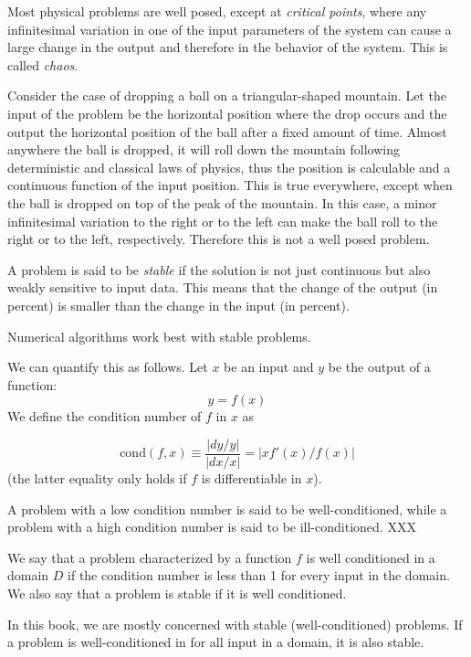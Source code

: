 \documentclass[justified, sixbynine]{tufte-book}
\def\func{\textrm}
\theoremstyle{plain}%
\newtheorem * {corollary}{Corollary}
\theoremstyle{definition}
\theoremstyle{remark}
\newtheorem * {remark}{Remark}
\newtheorem * {note}{Note}
\begin{document}
\begin{fullwidth}

Most physical problems are well posed, except at {\it critical points}, where any infinitesimal variation in one of the input parameters of the system can cause a large change in the output and therefore in the behavior of the system. This is called {\it chaos}.

Consider the case of dropping a ball on a triangular-shaped mountain. Let the input of the problem be the horizontal position where the drop occurs and the output the horizontal position of the ball after a fixed amount of time. Almost anywhere the ball is dropped, it will roll down the mountain following deterministic and classical laws of physics, thus the position is calculable and a continuous function of the input position. This is true everywhere, except when the ball is dropped on top of the peak of the mountain. In this case, a minor infinitesimal variation to the right or to the left can make the ball roll to the right or to the left, respectively.  Therefore this is not a well posed problem.

A problem is said to be {\it stable} if the solution is not just continuous but also weakly sensitive to input data. This means that the change of the output (in percent) is smaller than the change in the input (in percent).

Numerical algorithms work best with stable problems.

We can quantify this as follows. Let $x$ be an input and $y$ be the output of a function:
\begin{equation}
y = f(x)
\end{equation}
We define the condition number of $f$ in $x$ as


\begin{equation}
\func{cond}(f, x) \equiv \frac{|dy/y|}{|dx/x|} = |x f'(x)/f(x)|
\end{equation}
(the latter equality only holds if $f$ is differentiable in $x$).

A problem with a low condition number is said to be well-conditioned, while a problem with a high condition number is said to be ill-conditioned. XXX

We say that a problem characterized by a function $f$ is well conditioned in a domain $D$ if the condition number is less than 1 for every input in the domain. We also say that a problem is stable if it is well conditioned.

In this book, we are mostly concerned with stable (well-conditioned) problems. If a problem is well-conditioned in for all input in a domain, it is also stable.



\end{fullwidth}
\end{document}
